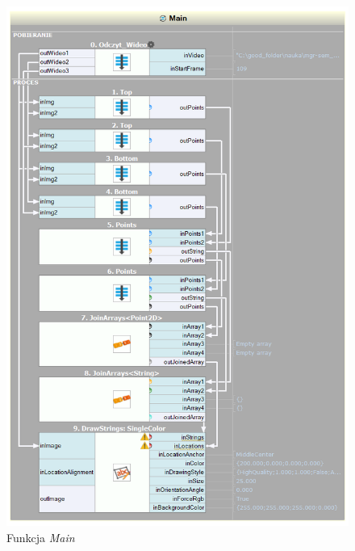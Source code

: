 \documentclass[11pt, a4paper]{article}
\begin{document}
\begin{figure}[p!]
	\centering
	\includegraphics[width = 0.75 \linewidth]{pro1}
	\caption{Funkcja \emph{Main}}
	\label{fig:main}
\end{figure}
\end{document}
